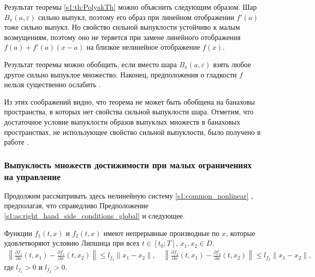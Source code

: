 \documentclass[../main.tex]{subfiles}
\begin{document}
Результат теоремы \ref{s1:th:PolyakTh} можно объяснить следующим образом.
Шар $B_x(a,\varepsilon)$ сильно выпукл, поэтому его образ при линейном отображении $f'(a)$ тоже сильно выпукл.
Но свойство сильной выпуклости устойчиво к малым возмущениям, поэтому оно не теряется при замене линейного отображения $f(a) + f'(a)(x - a)$ на близкое нелинейное отображение $f(x)$. 
    
Результат теоремы можно обобщить, если вместо шара $B_x(a,\varepsilon) $ взять любое другое сильно выпуклое множество.
Наконец, предположения о гладкости $f$ нельзя существенно ослабить \cite{Polyak2001, Polyak2001ru}.
    
Из этих соображений видно, что теорема не может быть обобщена на банаховы пространства, в которых нет свойства сильной выпуклости шара.
Отметим, что достаточное условие выпуклости  образов выпуклых множеств в банаховых пространствах, не использующее свойство сильной выпуклости, было получено в работе \cite{Ledyaev}. 
    
\subsubsection{Выпуклость множеств достижимости при малых ограничениях на управление}
    
Продолжим рассматривать здесь нелинейную систему \eqref{s1:common_nonlinear} , предполагая, что справедливо Предположение \ref{s1:as:right_hand_side_conditions_global} и следующее.
\begin{assumption}\label{s1:as:right_hand_side_diff_lip}
    Функции $f_1(t,x)$ и $f_2(t,x)$ имеют непрерывные производные по $x$, которые удовлетворяют условию Липшица при всех $t \in [t_0;T]$, $x_1, x_2 \in D$.
    \begin{gather*}
        \left\| \frac{\partial f_1}{\partial x}(t,x_1) - \frac{\partial f_1}{\partial x}(t,x_2) \right\| \leqslant l_{f_1} \| x_1 - x_2\|, \quad \left\| \frac{\partial f_2}{\partial x}(t,x_1) - \frac{\partial f_2}{\partial x}(t,x_2) \right\| \leqslant l_{f_2} \| x_1 - x_2\|,
    \end{gather*}
    где $l_{f_1} > 0$ и $l_{f_2} > 0$.
\end{assumption}
    
\end{document}
